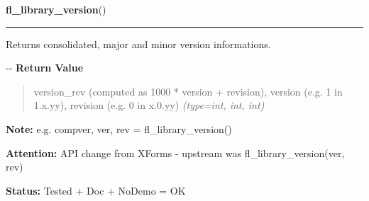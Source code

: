 \hspace{.8\funcindent}\begin{boxedminipage}{\funcwidth}

    \raggedright \textbf{fl\_library\_version}()

    \vspace{-1.5ex}

    \rule{\textwidth}{0.5\fboxrule}
\setlength{\parskip}{2ex}

Returns consolidated, major and minor version informations.

-{}-
\setlength{\parskip}{1ex}
      \textbf{Return Value}
    \vspace{-1ex}

      \begin{quote}

version\_rev (computed as 1000 * version + revision), version
(e.g. 1 in 1.x.yy), revision (e.g. 0 in x.0.yy)
      {\it (type=int, int, int)}

      \end{quote}

\textbf{Note:} 
e.g. compver, ver, rev = fl\_library\_version()


\textbf{Attention:} 
API change from XForms - upstream was
fl\_library\_version(ver, rev)


\textbf{Status:} 
Tested + Doc + NoDemo = OK


    \end{boxedminipage}

    \label{xformslib:flbasic:fl_bgn_form}

    \vspace{0.5ex}

